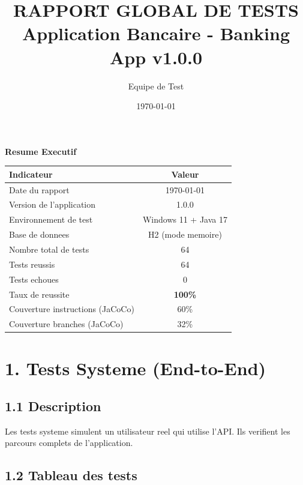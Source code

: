 \documentclass[12pt,a4paper]{article}
\title{\textbf{RAPPORT GLOBAL DE TESTS} \\
\large Application Bancaire - Banking App v1.0.0}
\author{Equipe de Test}
\date{\today}
\begin{document}
\maketitle

\begin{center}
\large\textbf{Resume Executif}
\end{center}

\vspace{0.5cm}

\begin{table}[h]
\centering
\begin{tabular}{|p{6cm}|c|}
\hline
\textbf{Indicateur} & \textbf{Valeur} \\
\hline
Date du rapport & \today \\
\hline
Version de l'application & 1.0.0 \\
\hline
Environnement de test & Windows 11 + Java 17 \\
\hline
Base de donnees & H2 (mode memoire) \\
\hline
Nombre total de tests & 64 \\
\hline
Tests reussis & 64 \\
\hline
Tests echoues & 0 \\
\hline
Taux de reussite & \textbf{100\%} \\
\hline
Couverture instructions (JaCoCo) & 60\% \\
\hline
Couverture branches (JaCoCo) & 32\% \\
\hline
\end{tabular}
\end{table}

\newpage

\section*{1. Tests Systeme (End-to-End)}

\subsection*{1.1 Description}
Les tests systeme simulent un utilisateur reel qui utilise l'API. Ils verifient les parcours complets de l'application.

\subsection*{1.2 Tableau des tests}
\end{document}
